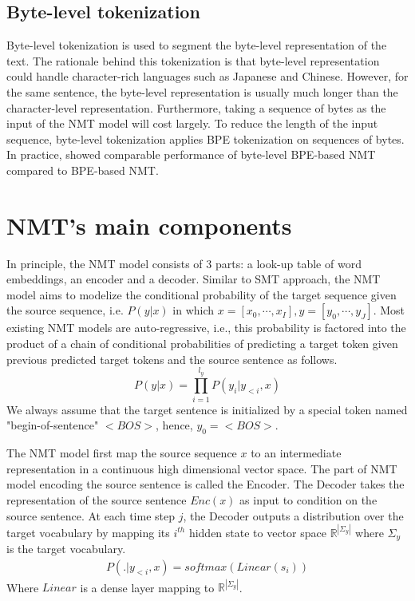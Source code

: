 \subsection{Byte-level tokenization}
Byte-level tokenization is used to segment the byte-level representation of the text. The rationale behind this tokenization is that byte-level representation could handle character-rich languages such as Japanese and Chinese. However, for the same sentence, the byte-level representation is usually much longer than the character-level representation. Furthermore, taking a sequence of bytes as the input of the NMT model will cost largely. To reduce the length of the input sequence, byte-level tokenization applies BPE tokenization on sequences of bytes. In practice, \cite{Wang19neural} showed comparable performance of byte-level BPE-based NMT compared to BPE-based NMT. 
\section{NMT's main components}
In principle, the NMT model consists of 3 parts: a look-up table of word embeddings, an encoder and a decoder. Similar to SMT approach, the NMT model aims to modelize the conditional probability of the target sequence given the source sequence, i.e. $P(y|x)$ in which $x=[x_0,\cdots,x_{I}], y=[y_0,\cdots,y_{J}]$. Most existing NMT models are auto-regressive, i.e., this probability is factored into the product of a chain of conditional probabilities of predicting a target token given previous predicted target tokens and the source sentence as follows.
\begin{equation}
P(y|x) = \displaystyle{\mathop{\prod}_{i=1}^{l_y}} P(y_i|y_{<i},x)
\end{equation}
We always assume that the target sentence is initialized by a special token named "begin-of-sentence" $<BOS>$, hence, $y_{0}=<BOS>$. 

The NMT model first map the source sequence $x$ to an intermediate representation in a continuous high dimensional vector space. The part of NMT model encoding the source sentence is called the Encoder. The Decoder takes the representation of the source sentence $Enc(x)$ as input to condition on the source sentence. At each time step $j$, the Decoder outputs a distribution over the target vocabulary by mapping its $i^{th}$ hidden state to vector space $\mathbb{R}^{|\Sigma_y|}$ where $\Sigma_y$ is the target vocabulary.
\begin{equation}
\begin{array}{rcl}
P(.|y_{<i},x) = softmax(Linear(s_i))
\end{array}
\end{equation}
Where $Linear$ is a dense layer mapping to $\mathbb{R}^{|\Sigma_y|}$.

